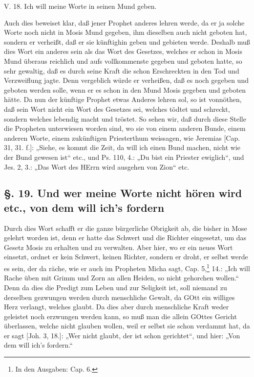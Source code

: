 \begin{schriftzitat}
V. 18. Ich will meine Worte in seinen Mund geben.
\end{schriftzitat}

Auch dies beweiset klar, daß jener Prophet anderes lehren werde, da er ja solche Worte noch nicht in Mosis Mund gegeben, ihm dieselben auch nicht geboten hat, sondern er verheißt, daß er sie künftighin geben und gebieten werde. Deshalb muß dies Wort ein anderes sein als das Wort des Gesetzes, welches er schon in Mosis Mund überaus reichlich und aufs vollkommenste gegeben und geboten hatte, so sehr gewaltig, daß es durch seine Kraft die schon Erschreckten in den Tod und Verzweiflung jagte. Denn vergeblich würde er verheißen, daß es noch gegeben und geboten werden solle, wenn er es schon in den Mund Mosis gegeben und geboten hätte. Da nun der künftige Prophet etwas Anderes lehren
sol, so ist vonnöthen, daß sein Wort nicht ein Wort des Gesetzes sei, welches tödtet und schreckt, sondern welches lebendig macht und tröstet. So sehen wir, daß durch diese Stelle die Propheten unterwiesen worden sind, wo sie von einem anderen Bunde, einem anderen Worte, einem zukünftigen Priesterthum weissagen, wie Jeremias [Cap. 31, 31. f.]: „Siehe, es kommt die Zeit, da will ich einen Bund machen, nicht wie der Bund gewesen ist“ etc., und Ps. 110, 4.: „Du bist ein Priester ewiglich“, und Jes. 2, 3.: „Das Wort des HErrn wird ausgehen von Zion“ etc.

\subsection[§. 19. Und wer meine Worte nicht hören wird]{§. 19. Und wer meine Worte nicht hören wird etc., von dem will ich’s fordern}

Durch dies Wort schafft er die ganze bürgerliche Obrigkeit ab, die bisher in Mose gelehrt worden ist, denn er hatte das Schwert und die Richter eingesetzt, um das Gesetz Mosis zu erhalten und zu verwalten. Aber hier, wo er ein neues Wort einsetzt, ordnet er kein Schwert, keinen Richter, sondern er droht, er selbst werde es sein, der da räche, wie er auch im Propheten Micha sagt, Cap. 5,\footnote{In den Ausgaben: Cap. 6.} 14.: „Ich will Rache üben mit Grimm und Zorn an allen Heiden, so nicht gehorchen wollen.“ Denn da dies die Predigt zum Leben und zur Seligkeit ist, soll niemand zu derselben gezwungen werden durch menschliche Gewalt, da GOtt ein williges Herz verlangt, welches glaubt. Da dies aber durch menschliche Kraft weder geleistet noch erzwungen werden kann, so muß man die allein GOttes Gericht überlassen, welche nicht glauben wollen, weil er selbst sie schon verdammt hat, da er sagt [Joh. 3, 18.]: „Wer nicht glaubt, der ist schon gerichtet“, und hier: „Von dem will ich’s fordern.“

